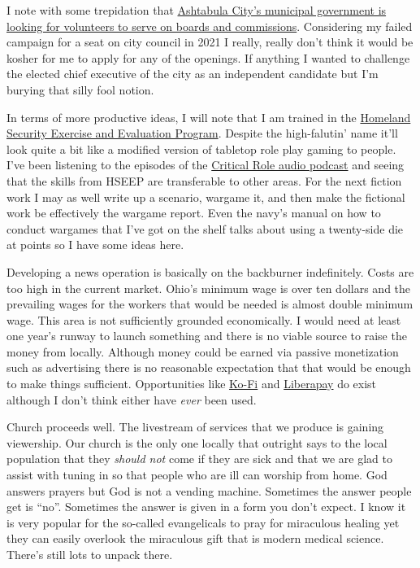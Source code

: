 I note with some trepidation that
\href{http://web.archive.org/web/20230311052727/https://www.starbeacon.com/news/city-of-ashtabula-seeking-board-and-commission-members/article_bb951e22-bf4c-11ed-9494-1b90edc0e608.html}{Ashtabula
City's municipal government is looking for volunteers to serve on boards
and commissions}. Considering my failed campaign for a seat on city
council in 2021 I really, really don't think it would be kosher for me
to apply for any of the openings. If anything I wanted to challenge the
elected chief executive of the city as an independent candidate but I'm
burying that silly fool notion.

In terms of more productive ideas, I will note that I am trained in the
\href{https://www.fema.gov/emergency-managers/national-preparedness/exercises/hseep}{Homeland
Security Exercise and Evaluation Program}. Despite the high-falutin'
name it'll look quite a bit like a modified version of tabletop role
play gaming to people. I've been listening to the episodes of the
\href{https://critrole.com/podcastfilter/one-shot/}{Critical Role audio
podcast} and seeing that the skills from HSEEP are transferable to other
areas. For the next fiction work I may as well write up a scenario,
wargame it, and then make the fictional work be effectively the wargame
report. Even the navy's manual on how to conduct wargames that I've got
on the shelf talks about using a twenty-side die at points so I have
some ideas here.

Developing a news operation is basically on the backburner indefinitely.
Costs are too high in the current market. Ohio's minimum wage is over
ten dollars and the prevailing wages for the workers that would be
needed is almost double minimum wage. This area is not sufficiently
grounded economically. I would need at least one year's runway to launch
something and there is no viable source to raise the money from locally.
Although money could be earned via passive monetization such as
advertising there is no reasonable expectation that that would be enough
to make things sufficient. Opportunities like
\href{https://ko-fi.com/smkellat}{Ko-Fi} and
\href{https://liberapay.com/smkellat}{Liberapay} do exist although I
don't think either have \emph{ever} been used.

Church proceeds well. The livestream of services that we produce is
gaining viewership. Our church is the only one locally that outright
says to the local population that they \emph{should not} come if they
are sick and that we are glad to assist with tuning in so that people
who are ill can worship from home. God answers prayers but God is not a
vending machine. Sometimes the answer people get is ``no''. Sometimes
the answer is given in a form you don't expect. I know it is very
popular for the so-called evangelicals to pray for miraculous healing
yet they can easily overlook the miraculous gift that is modern medical
science. There's still lots to unpack there.

